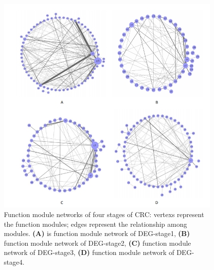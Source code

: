 \documentclass[utf8]{frontiersSCNS} %
\begin{document}
\begin{figure}[h]
	\begin{center}
		\includegraphics[width=0.98\linewidth,height=0.7\textheight]{FIG/module-network}
	\end{center}
	\caption{ Function module networks of four stages of CRC: vertexs represent the function modules; edges represent the relationship among modules.  \textbf{(A)} is function module network of DEG-stage1, \textbf{(B)} function module network of DEG-stage2, \textbf{(C)} function module network of DEG-stage3, \textbf{(D)} function module network of DEG-stage4.}\label{module-network}
\end{figure}
\end{document}

